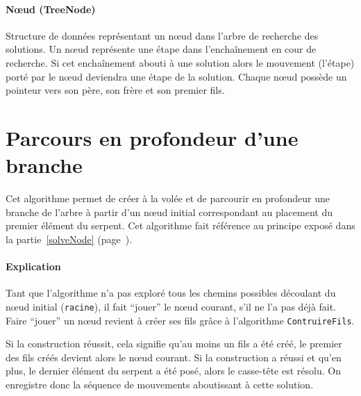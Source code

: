 \paragraph{Nœud (TreeNode)} Structure de données représentant un nœud dans l'arbre de recherche des solutions. Un nœud représente une étape dans l'enchaînement en cour de recherche. Si cet enchaînement abouti à une solution alors le mouvement (l'étape) porté par le nœud deviendra une étape de la solution.
Chaque nœud possède un pointeur vers son père, son frère et son premier fils.

\section{Parcours en profondeur d'une branche}
Cet algorithme permet de créer à la volée et de parcourir en profondeur une branche de l'arbre à partir d'un nœud initial correspondant au placement du premier élément du serpent. Cet algorithme fait référence au principe exposé dans la partie~\ref{solveNode} (page~\pageref{solveNode}).

\begin{algo}
 \VAR
 \ENDVAR
 \BEGIN
 \ENDIF
 \ELSE
 \ELSE
 \ENDIF
 \ENDIF
 \ENDWHILE
 \END
\end{algo}

\newpage
\paragraph{Explication}
Tant que l'algorithme n'a pas exploré tous les chemins possibles découlant du nœud initial (\verb|racine|), il fait ``jouer'' le nœud courant, s'il ne l'a pas déjà fait. Faire ``jouer'' un nœud revient à créer ses fils grâce à l'algorithme \verb|ContruireFils|.

Si la construction réussit, cela signifie qu'au moins un fils a été créé, le premier des fils créés devient alors le nœud courant. Si la construction a réussi et qu'en plus, le dernier élément du serpent a été posé, alors le casse-tête est résolu. On enregistre donc la séquence de mouvements aboutissant à cette solution.

